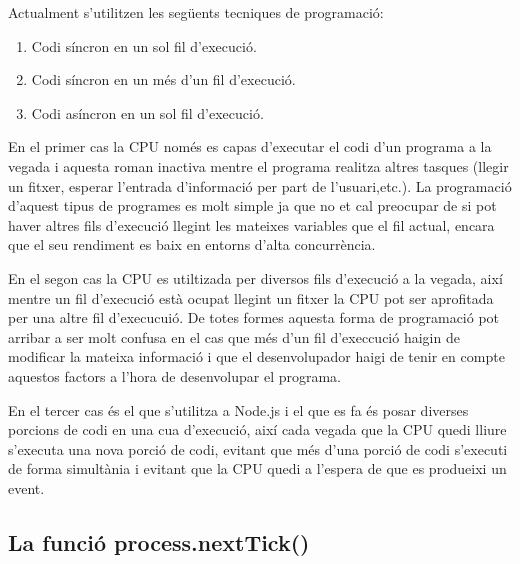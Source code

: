 Actualment s'utilitzen les següents tecniques de programació: 

\begin{enumerate}
    \item{Codi síncron en un sol fil d'execució.}
    \item{Codi síncron en un més d'un fil d'execució.}
    \item{Codi asíncron en un sol fil d'execució.}
\end{enumerate}

En el primer cas la CPU només es capas d'executar el codi d'un programa a la vegada i aquesta roman inactiva mentre el programa realitza altres tasques (llegir un fitxer, esperar l'entrada d'informació per part de l'usuari,etc.). La programació d'aquest tipus de programes es molt simple ja que no et cal preocupar de si pot haver altres fils d'execució llegint les mateixes variables que el fil actual, encara que el seu rendiment es baix en entorns d'alta concurrència. 

En el segon cas la CPU es utiltizada per diversos fils d'execució a la vegada, així mentre un fil d'execució està ocupat llegint un fitxer la CPU pot ser aprofitada per una altre fil d'execucuió. De totes formes aquesta forma de programació pot arribar a ser molt confusa en el cas que més d'un fil d'execcució haigin de modificar la mateixa informació i que el desenvolupador haigi de tenir en compte aquestos factors a l'hora de desenvolupar el programa. 

En el tercer cas és el que s'utilitza a Node.js i el que es fa és posar diverses porcions de codi en una cua d'execució, així cada vegada que la CPU quedi lliure s'executa una nova porció de codi, evitant que més d'una porció de codi s'executi de forma simultània i evitant que la CPU quedi a l'espera de que es produeixi un event.  

\subsection{La funció process.nextTick()}




